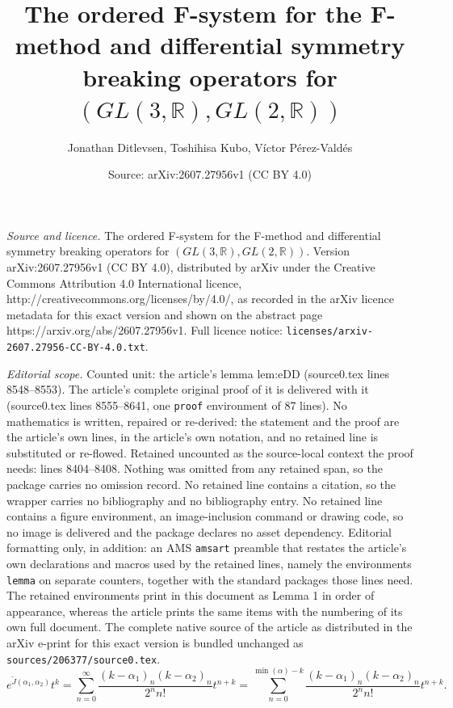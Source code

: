 \documentclass[10pt,a4paper]{amsart}
\title{The ordered F-system for the F-method and differential symmetry breaking operators for $(GL(3,\mathbb{R}), GL(2,\mathbb{R}))$}
\author{Jonathan Ditlevsen, Toshihisa Kubo, V{\' i}ctor P{\'e}rez-Vald{\'e}s}
\date{Source: arXiv:2607.27956v1 (CC BY 4.0)}
\begin{document}
\maketitle

\noindent\emph{Source and licence.} The ordered F-system for the F-method and differential symmetry breaking operators for $(GL(3,\mathbb{R}), GL(2,\mathbb{R}))$. Version arXiv:2607.27956v1 (CC BY 4.0), distributed by arXiv under the Creative Commons Attribution 4.0 International licence, http://creativecommons.org/licenses/by/4.0/, as recorded in the arXiv licence metadata for this exact version and shown on the abstract page https://arxiv.org/abs/2607.27956v1. Full licence notice: \texttt{licenses/arxiv-2607.27956-CC-BY-4.0.txt}.\par\smallskip

\noindent\textit{Editorial scope.} Counted unit: the article's lemma lem:eDD (source0.tex lines 8548--8553). The article's complete original proof of it is delivered with it (source0.tex lines 8555--8641, one \texttt{proof} environment of 87 lines). No mathematics is written, repaired or re-derived: the statement and the proof are the article's own lines, in the article's own notation, and no retained line is substituted or re-flowed.  Retained uncounted as the source-local context the proof needs: lines 8404--8408.  Nothing was omitted from any retained span, so the package carries no omission record.  No retained line contains a citation, so the wrapper carries no bibliography and no bibliography entry.  No retained line contains a figure environment, an image-inclusion command or drawing code, so no image is delivered and the package declares no asset dependency.  Editorial formatting only, in addition: an AMS \texttt{amsart} preamble that restates the article's own declarations and macros used by the retained lines, namely the environments \texttt{lemma} on separate counters, together with the standard packages those lines need.  The retained environments print in this document as Lemma 1 in order of appearance, whereas the article prints the same items with the numbering of its own full document.  The complete native source of the article as distributed in the arXiv e-print for this exact version is bundled unchanged as \texttt{sources/206377/source0.tex}.
\begin{equation}\label{eqn:eJk}
e^{\tilde{J}(\alpha_1, \alpha_2)}t^k
= \sum_{n=0}^{\infty}\frac{(k-\alpha_1)_n(k-\alpha_2)_n}{2^nn!}t^{n+k}
= \sum_{n=0}^{\min(\alpha)-k}\frac{(k-\alpha_1)_n(k-\alpha_2)_n}{2^nn!}t^{n+k}.
\end{equation}
\end{document}
